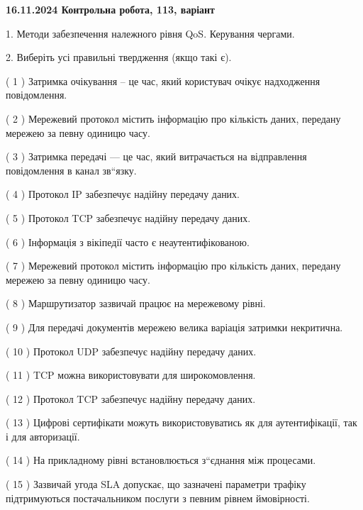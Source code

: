 \documentclass[12pt, ukrainian]{article}
\begin{document}
\vspace{4mm}
\newpage
\begin {large}

\textbf{16.11.2024 Контрольна робота, 113, варіант  }\par


{
1. Методи забезпечення належного рівня QoS. Керування чергами.



\vspace{5mm}
2. Виберіть усі правильні твердження (якщо такі є).\par
\vspace{2mm}

( 1 ) Затримка очікування – це час, який користувач очікує надходження повідомлення.

( 2 ) Мережевий протокол містить інформацію про кількість даних, передану мережею за певну одиницю часу.

( 3 ) Затримка передачі — це час, який витрачається на відправлення повідомлення в канал зв“язку.

( 4 ) Протокол IP забезпечує надійну передачу даних.

( 5 ) Протокол TCP забезпечує надійну передачу даних.

( 6 ) Інформація з вікіпедії часто є неаутентифікованою.

( 7 ) Мережевий протокол містить інформацію про кількість даних, передану мережею за певну одиницю часу.

( 8 ) Маршрутизатор зазвичай працює на мережевому рівні.

( 9 ) Для передачі документів мережею велика варіація затримки некритична.

( 10 ) Протокол UDP забезпечує надійну передачу даних.

( 11 ) TCP можна використовувати для широкомовлення.

( 12 ) Протокол TCP забезпечує надійну передачу даних.

( 13 ) Цифрові сертифікати можуть використовуватись як для аутентифікації, так і для авторизації.

( 14 ) На прикладному рівні встановлюється з“єднання між процесами.

( 15 ) Зазвичай угода  SLA допускає, що зазначені параметри трафіку підтримуються постачальником послуги з певним рівнем ймовірності.
}
\end {large}
\end{document}
